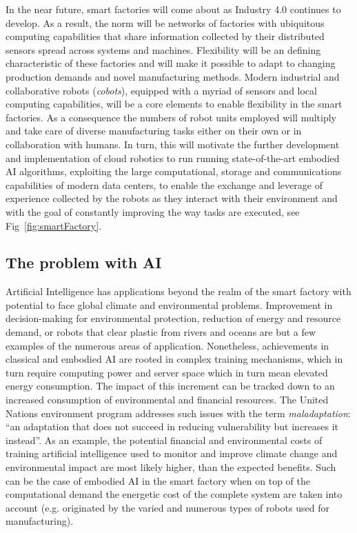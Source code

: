 In the near future, smart factories will come about as Industry 4.0 continues to develop. As a result, the norm will be networks of factories with ubiquitous computing capabilities that share information collected by their distributed sensors spread across systems and machines. Flexibility will be an defining characteristic of these factories and will make it possible to adapt to changing production demands and novel manufacturing methods. Modern industrial and collaborative robots (\emph{cobots}), equipped with a myriad of sensors and local computing capabilities, will be a core elements to enable flexibility in the smart factories. As a consequence the numbers of robot units employed will multiply and take care of diverse manufacturing tasks either on their own or in collaboration with humans. In turn, this will motivate the further development and implementation of cloud robotics to run running state-of-the-art embodied AI algorithms, exploiting the large computational, storage and communications capabilities of modern data centers, to enable the exchange and leverage of experience collected by the robots as they interact with their environment and with the goal of constantly improving the way tasks are executed, see Fig~\ref{fig:smartFactory}.

\subsection{The problem with AI}
Artificial Intelligence has applications beyond the realm of the smart factory with potential to face global climate and environmental problems\cite{pwcreport}. Improvement in decision-making for environmental protection, reduction of energy and resource demand, or robots that clear plastic from rivers and oceans are but a few examples of the numerous areas of application. Nonetheless, achievements in classical and embodied AI are rooted in complex training mechanisms, which in turn require computing power and server space which in turn mean elevated energy consumption. The impact of this increment can be tracked down to an increased consumption of environmental and financial resources. The United Nations environment program addresses such issues with the term \emph{maladaptation}: ``an adaptation that does not succeed in reducing vulnerability but increases it instead''\cite{un2019emerging}. As an example, the potential financial and environmental costs of training artificial intelligence used to monitor and improve climate change and environmental impact are most likely higher, than the expected benefits\cite{Strubell2019EnergyAP}. Such can be the case of embodied AI in the smart factory when on top of the computational demand the energetic cost of the complete system are taken into account (e.g. originated by the varied and numerous types of robots used for manufacturing). 


